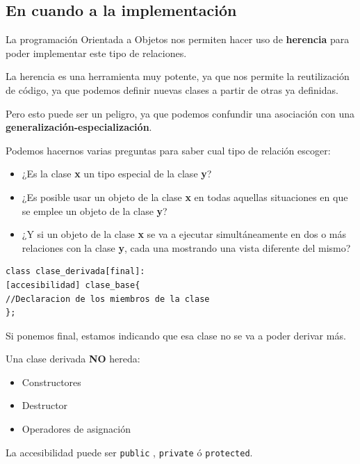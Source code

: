 \subsection{En cuando a la implementación}
La programación Orientada a Objetos nos permiten hacer uso de \textbf{herencia} para poder implementar este tipo de relaciones.

La herencia es una herramienta muy potente, ya que nos permite la reutilización de código, ya que podemos definir nuevas clases a partir de otras ya definidas.

Pero esto puede ser un peligro, ya que podemos confundir una asociación con una \textbf{generalización-especialización}.

Podemos hacernos varias preguntas para saber cual tipo de relación escoger:
\begin{itemize}
	\item ¿Es la clase \textbf{x} un tipo especial de la clase \textbf{y}?
	\item ¿Es posible usar un objeto de la clase \textbf{x} en todas aquellas situaciones en que se emplee un objeto de la clase \textbf{y}?
	\item ¿Y si un objeto de la clase \textbf{x} se va a ejecutar simultáneamente en dos o más relaciones con la clase \textbf{y}, cada una mostrando una vista diferente del mismo?
\end{itemize}

\begin{minipage}[t]{0.5\textwidth}
	\begin{lstlisting}[frame=single]
class clase_derivada[final]:
[accesibilidad] clase_base{
//Declaracion de los miembros de la clase
};
	\end{lstlisting}
Si ponemos final, estamos indicando que esa clase no se va a poder derivar más.
\end{minipage}
\hfill
\begin{minipage}[t]{0.41\textwidth}
Una clase derivada \textbf{NO} hereda:
	\begin{itemize}
		\item Constructores
		\item Destructor
		\item Operadores de asignación
	\end{itemize}
\end{minipage}

La accesibilidad puede ser \texttt{public} , \texttt{private} ó \texttt{protected}.\vspace*{0.4cm}

